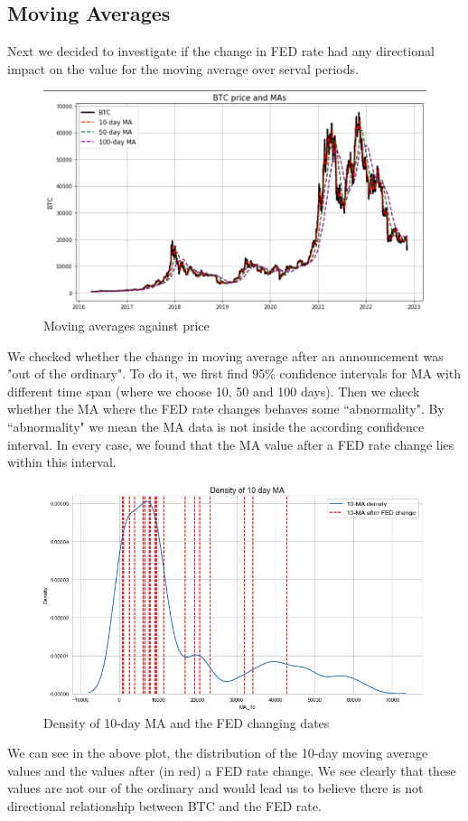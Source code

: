 \documentclass[12pt]{article}
\begin{document}
\subsection{Moving Averages}
Next we decided to investigate if the change in FED rate had any directional impact on the value for the moving average over serval periods.
\begin{figure}[H]
   \includegraphics[scale=0.6]{research_project/text/paper/2.png}
   \centering
   \caption{Moving averages against price}
   \label{fig:ma}
\end{figure}
We checked whether the change in moving average after an announcement was "out of the ordinary". To do it, we first find  95\% confidence intervals for MA with different time span (where we choose 10, 50 and 100 days). Then we check whether the MA where the FED rate changes behaves some ``abnormality". By ``abnormality" we mean the MA data is not inside the according confidence interval. In every case, we found that the MA value after a FED rate change lies within this interval.
\begin{figure}[H]
   \includegraphics[width=\textwidth]{research_project/text/paper/density10ma.png}
   \centering
   \caption{Density of 10-day MA and the FED changing dates }
   \label{fig:10dayma}
\end{figure}
We can see in the above plot, the distribution of the 10-day moving average values and the values after (in red) a FED rate change. We see clearly that these values are not our of the ordinary and would lead us to believe there is not directional relationship between BTC and the FED rate. 
\end{document}
